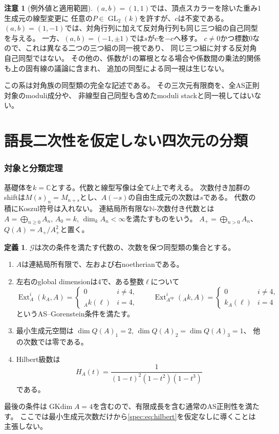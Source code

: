 \documentclass[11pt,a4paper]{ltjsarticle}
\theoremstyle{definition}
\newtheorem{definition}[theorem]{定義}
\newcommand{\Ext}{\operatorname{Ext}}
\newcommand{\GL}{\operatorname{GL}}
\newcommand{\GKdim}{\operatorname{GKdim}}
\newcommand{\Gclass}{\mathcal G}
\newtheorem{remark}[theorem]{注意}
\begin{document}
\begin{remark}[例外値と適用範囲]
$(a,b)=(1,1)$では、頂点スカラーを除いた重み1生成元の線型変更に
任意の$P\in\GL_2(k)$を許すが、$c$は不変である。
$(a,b)=(1,-1)$では、対角行列に加えて反対角行列も同じ三つ組の自己同型を与える。
一方、$(a,b)=(-1,\pm1)$では$s$が$c$を$-c$へ移す。
$c\ne0$かつ標数0なので、これは異なる二つの三つ組の同一視であり、
同じ三つ組に対する反対角自己同型ではない。
その他の、係数が1の冪根となる場合や係数間の乗法的関係も上の固有線の議論に含まれ、
追加の同型による同一視は生じない。

この系は対角族の同型類の完全な記述である。
その三次元有限商を、全AS正則対象のmoduli成分や、
非線型自己同型も含めたmoduli stackと同一視してはいない。
\end{remark}



\clearpage
\part{語長二次性を仮定しない四次元の分類}\label{part:nonquadratic}
\section{対象と分類定理}\label{spec:sec:theorem}
基礎体を$k=\mathbb C$とする。代数と線型写像は全て$k$上で考える。
次数付き加群のshiftは$M(s)_n=M_{n+s}$とし、$A(-s)$の自由生成元の次数は$s$である。
代数の積にKoszul符号は入れない。
連結局所有限な$\mathbb N$-次数付き代数とは
$A=\bigoplus_{n\geq0}A_n$, $A_0=k$, $\dim_k A_n<\infty$を満たすものをいう。
$A_+=\bigoplus_{n>0}A_n$、$Q(A)=A_+/A_+^2$と置く。

\begin{definition}\label{spec:def:graded-target}
$\Gclass$は次の条件を満たす代数の、次数を保つ同型類の集合とする。
\begin{enumerate}
\item $A$は連結局所有限で、左および右noetherianである。
\item 左右のglobal dimensionは4で、ある整数$\ell$について
\[
\Ext_A^i(k_A,A)=
\begin{cases}0&i\ne4,\\ {}_Ak(\ell)&i=4,\end{cases}
\qquad
\Ext_{A^{\mathrm{op}}}^i({}_Ak,A)=
\begin{cases}0&i\ne4,\\ k_A(\ell)&i=4\end{cases}
\]
というAS--Gorenstein条件を満たす。
\item 最小生成元空間は
$\dim Q(A)_1=2$, $\dim Q(A)_2=\dim Q(A)_3=1$、
他の次数では零である。
\item Hilbert級数は
\begin{equation}\label{spec:eq:hilbert}
H_A(t)=\frac{1}{(1-t)^2(1-t^2)(1-t^3)}
\end{equation}
である。
\end{enumerate}
最後の条件は$\GKdim A=4$を含むので、有限成長を含む通常のAS正則性を満たす。
ここでは最小生成元次数だけから\eqref{spec:eq:hilbert}を仮定なしに導くことは主張しない。
\end{definition}
\end{document}

